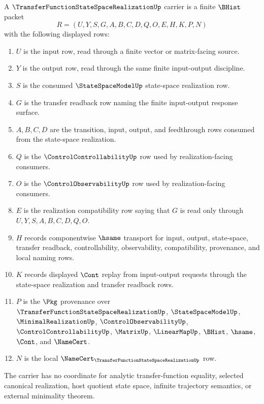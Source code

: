 \begin{definition}
\label{def:transfer-function-state-space-realization-carrier}
A $\TransferFunctionStateSpaceRealizationUp$ carrier is a finite $\BHist$ packet
$$
R=(U,Y,S,G,A,B,C,D,Q,O,E,H,K,P,N)
$$
with the following displayed rows:
\begin{enumerate}
\item $U$ is the input row, read through a finite vector or matrix-facing source.
\item $Y$ is the output row, read through the same finite input-output discipline.
\item $S$ is the consumed $\StateSpaceModelUp$ state-space realization row.
\item $G$ is the transfer readback row naming the finite input-output response surface.
\item $A,B,C,D$ are the transition, input, output, and feedthrough rows consumed from the state-space realization.
\item $Q$ is the $\ControlControllabilityUp$ row used by realization-facing consumers.
\item $O$ is the $\ControlObservabilityUp$ row used by realization-facing consumers.
\item $E$ is the realization compatibility row saying that $G$ is read only through $U,Y,S,A,B,C,D,Q,O$.
\item $H$ records componentwise $\hsame$ transport for input, output, state-space, transfer readback, controllability, observability, compatibility, provenance, and local naming rows.
\item $K$ records displayed $\Cont$ replay from input-output requests through the state-space realization and transfer readback rows.
\item $P$ is the $\Pkg$ provenance over $\TransferFunctionStateSpaceRealizationUp$, $\StateSpaceModelUp$, $\MinimalRealizationUp$, $\ControlObservabilityUp$, $\ControlControllabilityUp$, $\MatrixUp$, $\LinearMapUp$, $\BHist$, $\hsame$, $\Cont$, and $\NameCert$.
\item $N$ is the local $\NameCert_{\TransferFunctionStateSpaceRealizationUp}$ row.
\end{enumerate}
The carrier has no coordinate for analytic transfer-function equality, selected canonical realization, host quotient state space, infinite trajectory semantics, or external minimality theorem.
\end{definition}


